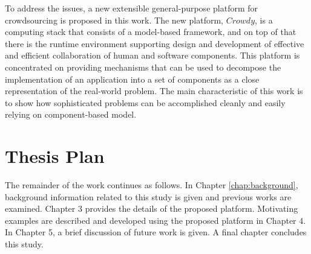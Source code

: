 To address the issues, a new extensible general-purpose platform for crowdsourcing 
is proposed in this work. The new platform, $Crowdy$, is a computing stack that 
consists of a model-based framework, and on top of that there is the runtime environment 
supporting design and development of effective and efficient collaboration of
human and software components. This platform is concentrated on providing 
mechanisms that can be used to decompose the implementation of an application 
into a set of components as a close representation of the real-world problem. 
The main characteristic of this work is to show how sophisticated problems can be 
accomplished cleanly and easily relying on component-based model.


\section{Thesis Plan}

The remainder of the work continues as follows. In Chapter \ref{chap:background}, background information related to this study is given and previous works are examined. Chapter 3 provides the details of the proposed platform. Motivating examples are described and developed using the proposed platform in Chapter 4. In Chapter 5, a brief discussion of future work is given. A final chapter concludes this study.
